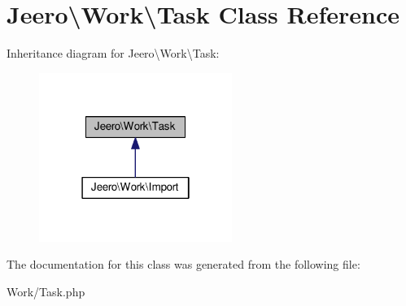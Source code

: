 \hypertarget{classJeero_1_1Work_1_1Task}{}\section{Jeero\textbackslash{}Work\textbackslash{}Task Class Reference}
\label{classJeero_1_1Work_1_1Task}


Inheritance diagram for Jeero\textbackslash{}Work\textbackslash{}Task\+:\nopagebreak
\begin{figure}[H]
\begin{center}
\leavevmode
\includegraphics[width=178pt]{classJeero_1_1Work_1_1Task__inherit__graph}
\end{center}
\end{figure}


The documentation for this class was generated from the following file\+:\begin{DoxyCompactItemize}
\item 
Work/Task.\+php\end{DoxyCompactItemize}
